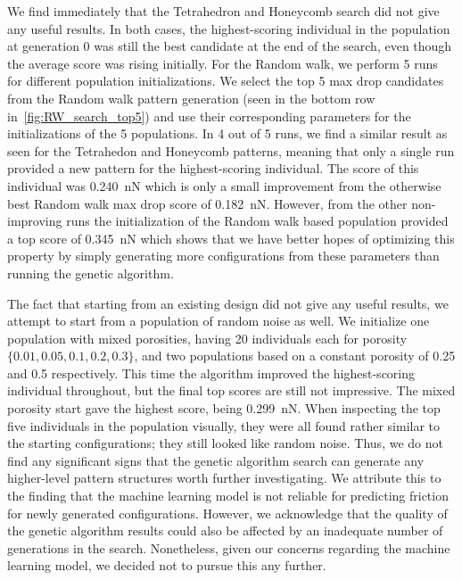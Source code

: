 We find immediately that the Tetrahedron and Honeycomb search did not give any useful results. In both cases, the highest-scoring individual in the population at generation 0 was still the best candidate at the end of the search, even though the average score was rising initially. For the Random walk, we perform 5 runs for different population initializations. We select the top 5 max drop candidates from the Random walk pattern generation (seen in the bottom row in~\cref{fig:RW_search_top5}) and use their corresponding parameters for the initializations of the 5 populations. In 4 out of 5 runs, we find a similar result as seen for the Tetrahedon and Honeycomb patterns, meaning that only a single run provided a new pattern for the highest-scoring individual. The score of this individual was \SI{0.240}{nN} which is only a small improvement from the otherwise best Random walk max drop score of
\SI{0.182}{nN}. However, from the other non-improving runs the initialization of the Random walk based population provided a top score of \SI{0.345}{nN} which shows that we have better hopes of optimizing this property by simply generating more configurations from these parameters than running the genetic algorithm. 

The fact that starting from an existing design did not give any useful results, we attempt to start from a population of random noise as well. We initialize one population with mixed porosities, having 20 individuals each for porosity $\{0.01, 0.05, 0.1, 0.2, 0.3\}$, and two populations based on a constant porosity of 0.25 and 0.5 respectively. This time the algorithm improved the highest-scoring individual throughout, but
the final top scores are still not impressive. The mixed porosity start gave the
highest score, being \SI{0.299}{nN}. When inspecting the top five individuals in the population visually, they were all found rather similar to the starting configurations; they still looked like random noise. Thus, we do not find any significant signs that the genetic algorithm search can generate any higher-level pattern structures worth further investigating. We attribute this to the finding that the machine learning model is not reliable for predicting friction for newly generated configurations. However, we acknowledge that the quality of the genetic algorithm results could also be affected by an inadequate number of generations in the search. Nonetheless, given our concerns regarding the machine learning model, we decided not to pursue this any further.

